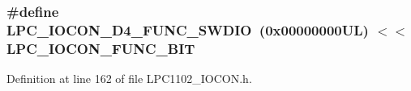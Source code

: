 \subsubsection[{\texorpdfstring{L\+P\+C\+\_\+\+I\+O\+C\+O\+N\+\_\+\+D4\+\_\+\+F\+U\+N\+C\+\_\+\+S\+W\+D\+IO}{LPC_IOCON_D4_FUNC_SWDIO}}]{\setlength{\rightskip}{0pt plus 5cm}\#define L\+P\+C\+\_\+\+I\+O\+C\+O\+N\+\_\+\+D4\+\_\+\+F\+U\+N\+C\+\_\+\+S\+W\+D\+IO~(0x00000000\+U\+L) $<$$<$ L\+P\+C\+\_\+\+I\+O\+C\+O\+N\+\_\+\+F\+U\+N\+C\+\_\+\+B\+IT}\hypertarget{group___l_p_c___i_o_c_o_n___l_p_c1102___p_i_n_e_s_ga7d0843dbf1f39f41e01cdcf0ea1396f8}{}\label{group___l_p_c___i_o_c_o_n___l_p_c1102___p_i_n_e_s_ga7d0843dbf1f39f41e01cdcf0ea1396f8}


Definition at line 162 of file L\+P\+C1102\+\_\+\+I\+O\+C\+O\+N.\+h.

